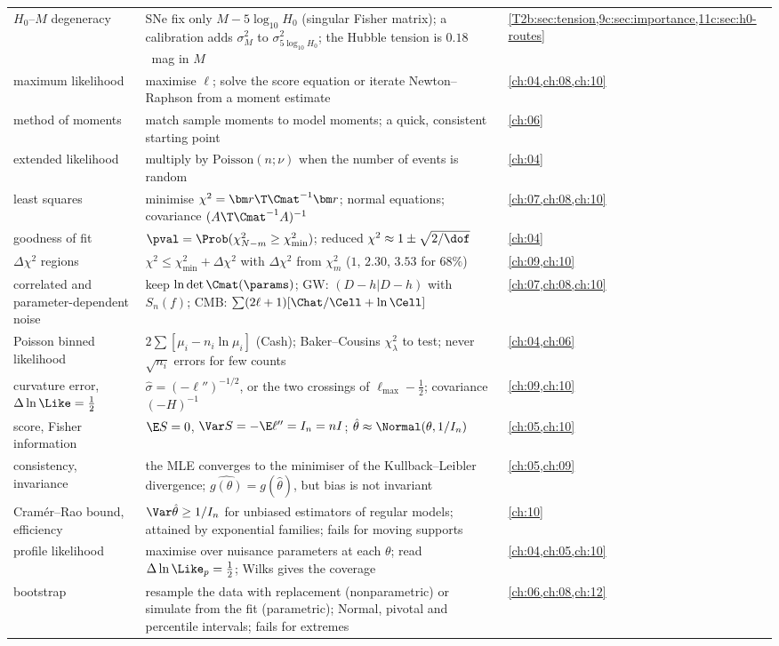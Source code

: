 \begin{center}
\begin{tabularx}{\linewidth}{@{}>{\raggedright\arraybackslash}p{3.3cm}
                               >{\raggedright\arraybackslash}X
                               >{\raggedright\arraybackslash}p{2.7cm}@{}}
$H_0$--$M$ degeneracy & SNe fix only $M-5\log_{10}H_0$ (singular Fisher matrix); a calibration adds $\sigma_M^2$ to $\sigma^2_{5\log_{10}H_0}$; the Hubble tension is $0.18$~mag in $M$ & \cref{T2b:sec:tension,9c:sec:importance,11c:sec:h0-routes}\\
maximum likelihood & maximise $\ell$; solve the score equation or iterate Newton--Raphson from a moment estimate & \cref{ch:04,ch:08,ch:10}\\
method of moments & match sample moments to model moments; a quick, consistent starting point & \cref{ch:06}\\
extended likelihood & multiply by $\mathrm{Poisson}(n;\nu)$ when the number of events is random & \cref{ch:04}\\
least squares & minimise $\chi^2=\bm r\T\Cmat^{-1}\bm r$; normal equations; covariance $(A\T\Cmat^{-1}A)^{-1}$ & \cref{ch:07,ch:08,ch:10}\\
goodness of fit & $\pval=\Prob(\chi^2_{N-m}\ge\chi^2_{\min})$; reduced $\chi^2\approx1\pm\sqrt{2/\dof}$ & \cref{ch:04}\\
$\Delta\chi^2$ regions & $\chi^2\le\chi^2_{\min}+\Delta\chi^2$ with $\Delta\chi^2$ from $\chi^2_m$ ($1$, $2.30$, $3.53$ for $68\%$) & \cref{ch:09,ch:10}\\
correlated and parameter-dependent noise & keep $\ln\det\Cmat(\params)$; GW: $(D-h|D-h)$ with $S_n(f)$; CMB: $\sum(2\ell+1)[\Chat/\Cell+\ln\Cell]$ & \cref{ch:07,ch:08,ch:10}\\
Poisson binned likelihood & $2\sum[\mu_i-n_i\ln\mu_i]$ (Cash); Baker--Cousins $\chi^2_\lambda$ to test; never $\sqrt{n_i}$ errors for few counts & \cref{ch:04,ch:06}\\
curvature error, $\Delta\ln\Like=\tfrac12$ & $\hat\sigma=(-\ell'')^{-1/2}$, or the two crossings of $\ell_{\max}-\tfrac12$; covariance $(-H)^{-1}$ & \cref{ch:09,ch:10}\\
score, Fisher information & $\E S=0$, $\Var S=-\E\ell''=I_n=nI$; $\hat\theta\approx\Normal(\theta,1/I_n)$ & \cref{ch:05,ch:10}\\
consistency, invariance & the MLE converges to the minimiser of the Kullback--Leibler divergence; $\widehat{g(\theta)}=g(\hat\theta)$, but bias is not invariant & \cref{ch:05,ch:09}\\
Cram\'er--Rao bound, efficiency & $\Var\hat\theta\ge1/I_n$ for unbiased estimators of regular models; attained by exponential families; fails for moving supports & \cref{ch:10}\\
profile likelihood & maximise over nuisance parameters at each $\theta$; read $\Delta\ln\Like_p=\tfrac12$; Wilks gives the coverage & \cref{ch:04,ch:05,ch:10}\\
bootstrap & resample the data with replacement (nonparametric) or simulate from the fit (parametric); Normal, pivotal and percentile intervals; fails for extremes & \cref{ch:06,ch:08,ch:12}\\
\bottomrule
\end{tabularx}
\end{center}

